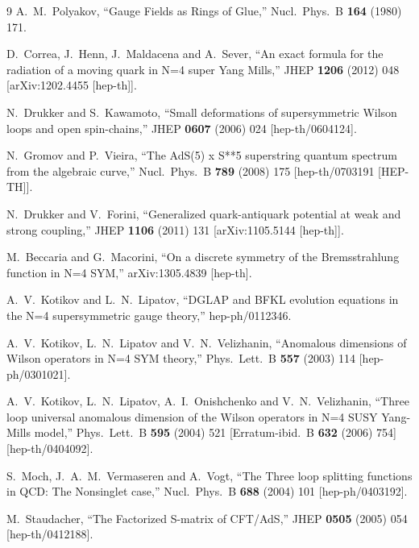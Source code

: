 \documentclass[a4paper,11pt]{article}
\numberwithin{equation}{section}
\begin{document}
\begin{thebibliography} {9}
  A.~M.~Polyakov,
  ``Gauge Fields as Rings of Glue,''
  Nucl.\ Phys.\ B {\bf 164} (1980) 171.

  D.~Correa, J.~Henn, J.~Maldacena and A.~Sever,
  ``An exact formula for the radiation of a moving quark in N=4 super Yang Mills,''
  JHEP {\bf 1206} (2012) 048
  [arXiv:1202.4455 [hep-th]].

  N.~Drukker and S.~Kawamoto,
  ``Small deformations of supersymmetric Wilson loops and open spin-chains,''
  JHEP {\bf 0607} (2006) 024
  [hep-th/0604124].

  N.~Gromov and P.~Vieira,
  ``The AdS(5) x S**5 superstring quantum spectrum from the algebraic curve,''
  Nucl.\ Phys.\ B {\bf 789} (2008) 175
  [hep-th/0703191 [HEP-TH]].

  N.~Drukker and V.~Forini,
  ``Generalized quark-antiquark potential at weak and strong coupling,''
  JHEP {\bf 1106} (2011) 131
  [arXiv:1105.5144 [hep-th]].

  M.~Beccaria and G.~Macorini,
  ``On a discrete symmetry of the Bremsstrahlung function in N=4 SYM,''
  arXiv:1305.4839 [hep-th].

  A.~V.~Kotikov and L.~N.~Lipatov,
  ``DGLAP and BFKL evolution equations in the N=4 supersymmetric gauge theory,''
  hep-ph/0112346.

  A.~V.~Kotikov, L.~N.~Lipatov and V.~N.~Velizhanin,
  ``Anomalous dimensions of Wilson operators in N=4 SYM theory,''
  Phys.\ Lett.\ B {\bf 557} (2003) 114
  [hep-ph/0301021].

  A.~V.~Kotikov, L.~N.~Lipatov, A.~I.~Onishchenko and V.~N.~Velizhanin,
  ``Three loop universal anomalous dimension of the Wilson operators in N=4 SUSY Yang-Mills model,''
  Phys.\ Lett.\ B {\bf 595} (2004) 521
   [Erratum-ibid.\ B {\bf 632} (2006) 754]
  [hep-th/0404092].

  S.~Moch, J.~A.~M.~Vermaseren and A.~Vogt,
  ``The Three loop splitting functions in QCD: The Nonsinglet case,''
  Nucl.\ Phys.\ B {\bf 688} (2004) 101
  [hep-ph/0403192].

  M.~Staudacher,
  ``The Factorized S-matrix of CFT/AdS,''
  JHEP {\bf 0505} (2005) 054
  [hep-th/0412188].


\end{thebibliography}
\end{document}
